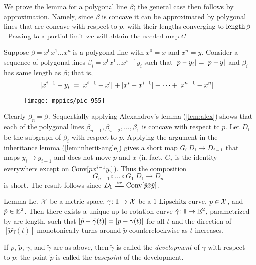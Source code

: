 We prove the lemma for a polygonal line $\beta$;
the general case then follows by approximation.
Namely, since $\beta$ is concave 
it can be approximated by polygonal lines that are concave with respect to $p$, 
with their lengths converging to $\mathop{\rm length}\nolimits \beta$. 
Passing to a partial limit we will obtain the needed map $G$.  

Suppose $\beta=x^0x^1\dots x^n$ is a polygonal line with $x^0=x$ and $x^n=y$.
Consider a sequence of polygonal lines $\beta_i=x^0x^1\dots x^{i-1}y_i$ such that $\dist{p}{y_i}{}=\dist{p}{y}{}$ and 
$\beta_i$ has same length as $\beta$; 
that is, 
\[\dist{x^{i-1}}{y_i}{}=\dist{x^{i-1}}{x^{i}}{}+\dist{x^{i}}{x^{i+1}}{}+\dots+\dist{x^{n-1}}{x^n}{}.\]

\begin{figure}[!ht]
\vskip-0mm
\centering
\texttt{[image: mppics/pic-955]}
\end{figure}

Clearly $\beta_n=\beta$.
Sequentially applying Alexandrov's lemma (\ref{lem:alex}) shows that each of the polygonal lines $\beta_{n-1}, \beta_{n-2},\dots,\beta_1$ is concave with respect to $p$.
Let $D_i$ be the subgraph of $\beta_i$ with respect to $p$.
Applying the argument in the inheritance lemma (\ref{lem:inherit-angle}) gives a short map $G_i\:D_{i}\to D_{i+1}$ that maps $y_{i}\mapsto y_{i+1}$ and does not move $p$ and $x$ (in fact,  $G_i$ is the identity everywhere except on $\mathop{\rm Conv}\nolimits[px^{i-1}y_i]$).
Thus the composition 
\[G_{n-1}\circ\dots\circ G_1\: D_1\to D_n\] 
is short.
The result follows since $D_1\iso\Conv\trig{\tilde p}{\tilde x}{\tilde y}$.
\qeds

\begin{thm}{Lemma}\label{lem:devel}\label{def:devel}
Let $\mathcal{X}$ be a metric space, 
$\gamma\colon\mathbb{I}\to \mathcal{X}$ be a $1$-Lipschitz curve,
$p\in \mathcal{X}$,
and $\tilde p\in\mathbb{E}^2$.
Then there exists a unique up to rotation curve
$\tilde \gamma\colon \mathbb{I}\to \mathbb{E}^2$, parametrized by arc-length, 
such that
$\dist{\tilde p}{\tilde \gamma(t)}{}\z=\dist{p}{\gamma(t)}{}$ for all $t$
and the direction of
$[\tilde p\tilde \gamma(t)]$ monotonically turns around $\tilde p$ counterclockwise as $t$ increases.
\end{thm}

If $p$, $\tilde p$, $\gamma$, and $\tilde \gamma$ are as above,
then $\tilde \gamma$ is called the \emph{development} of $\gamma$ with respect to $p$; 
the point $\tilde p$ is called the \emph{basepoint} of the development.

